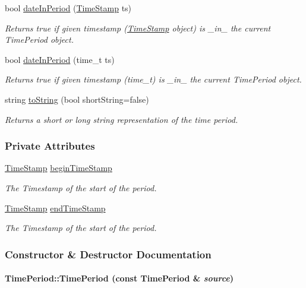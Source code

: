 \begin{CompactItemize}
bool \hyperlink{classTimePeriod_TimePerioda6}{date\-In\-Period} (\hyperlink{classTimeStamp}{Time\-Stamp} ts)
\begin{CompactList}\small\item\em Returns true if given timestamp (\hyperlink{classTimeStamp}{Time\-Stamp} object) is \_\-in\_\- the current Time\-Period object.\item\end{CompactList}\item 
bool \hyperlink{classTimePeriod_TimePerioda7}{date\-In\-Period} (time\_\-t ts)
\begin{CompactList}\small\item\em Returns true if given timestamp (time\_\-t) is \_\-in\_\- the current Time\-Period object.\item\end{CompactList}\item 
string \hyperlink{classTimePeriod_TimePerioda8}{to\-String} (bool short\-String=false)
\begin{CompactList}\small\item\em Returns a short or long string representation of the time period.\item\end{CompactList}\end{CompactItemize}
\subsubsection*{Private Attributes}
\begin{CompactItemize}
\item 
\hyperlink{classTimeStamp}{Time\-Stamp} \hyperlink{classTimePeriod_TimePeriodo0}{begin\-Time\-Stamp}
\begin{CompactList}\small\item\em The Timestamp of the start of the period.\item\end{CompactList}\item 
\hyperlink{classTimeStamp}{Time\-Stamp} \hyperlink{classTimePeriod_TimePeriodo1}{end\-Time\-Stamp}
\begin{CompactList}\small\item\em The Timestamp of the start of the period.\item\end{CompactList}\end{CompactItemize}


\subsubsection{Constructor \& Destructor Documentation}
\hypertarget{classTimePeriod_TimePerioda0}{
\paragraph[TimePeriod]{\setlength{\rightskip}{0pt plus 5cm}Time\-Period::Time\-Period (const Time\-Period \& {\em source})}\hfill}
\label{classTimePeriod_TimePerioda0}


